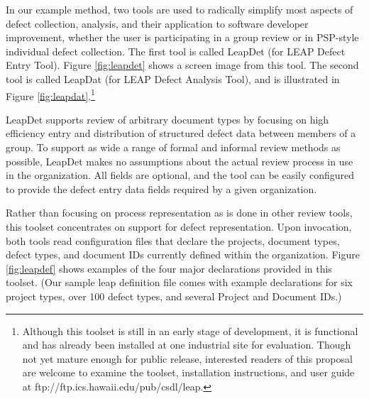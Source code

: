In our example method, two tools are used to radically simplify most
aspects of defect collection, analysis, and their application to software
developer improvement, whether the user is participating in a group review or in
PSP-style individual defect collection.  The first tool is called LeapDet
(for LEAP Defect Entry Tool). Figure \ref{fig:leapdet} shows a screen image
from this tool.  The second tool is called LeapDat (for LEAP Defect
Analysis Tool), and is illustrated in Figure \ref{fig:leapdat}.\footnote{Although this toolset is still in an early stage of development,
  it is functional and has already been installed at one industrial
  site for evaluation. Though not yet mature enough for
  public release, interested readers of this proposal are welcome to
  examine the toolset, installation instructions, and user guide at
  ftp://ftp.ics.hawaii.edu/pub/csdl/leap.}

\begin{figure*}[t]
{\centerline {}}
 \caption{{\em A LEAP-compliant defect entry tool. The system enables
 reviewers to efficiently raise issues about work products, distribute
 the results to other members of the review team, and save the data for
 later empirical analysis using the Leap Defect Analysis Tool.}}
 \label{fig:leapdet}
\end{figure*}

LeapDet supports review of arbitrary document types by focusing on high
efficiency entry and distribution of structured defect data between members
of a group.  To support as wide a range of formal and informal review
methods as possible, LeapDet makes no assumptions about the actual
review process in use in the organization. All fields are optional, and the
tool can be easily configured to provide the defect entry data fields
required by a given organization. 

Rather than focusing on process representation as is done in other review
tools, this toolset concentrates on support for defect representation.
Upon invocation, both tools read configuration files that declare the
projects, document types, defect types, and document IDs currently defined
within the organization.  Figure \ref{fig:leapdef} shows examples of the
four major declarations provided in this toolset. (Our sample leap
definition file comes with example declarations for six project types, over
100 defect types, and several Project and Document IDs.)

